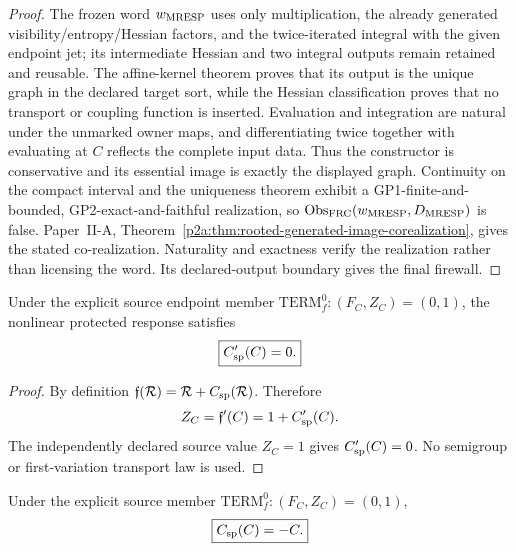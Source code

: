 \documentclass[12pt,a4paper]{article}
\begin{document}
\begin{proof}
The frozen word \(w_{\rm MRESP}\) uses only multiplication, the already generated
visibility/entropy/Hessian factors, and the twice-iterated integral with the
given endpoint jet; its intermediate Hessian and two integral outputs remain
retained and reusable.  The affine-kernel theorem proves that its output is the
unique graph in the declared target sort, while the Hessian classification
proves that no transport or coupling function is inserted.  Evaluation and
integration are natural under the unmarked owner maps, and differentiating
twice together with evaluating at \(C\) reflects the complete input data.
Thus the constructor is conservative and its essential image is exactly the
displayed graph.  Continuity on the compact interval and the uniqueness
theorem exhibit a GP1-finite-and-bounded, GP2-exact-and-faithful realization,
so \(\operatorname{Obs}_{\rm FRC}(w_{\rm MRESP},D_{\rm MRESP})\) is false.
Paper~II-A,
Theorem~\ref{p2a:thm:rooted-generated-image-corealization}, gives the stated
co-realization.  Naturality and exactness verify the realization rather than
licensing the word.  Its declared-output boundary gives the final firewall.
\end{proof}

\begin{lemma}
\label{p3:lem:terminal-protected-slope}
Under the explicit source endpoint member
\(\mathrm{TERM}_f^0:(F_C,Z_C)=(0,1)\), the nonlinear protected
response satisfies
\begin{equation}
\label{p3:eq:terminal-protected-zero-slope}
 \boxed{C_{\rm sp}'(C)=0.}
\end{equation}
\end{lemma}

\begin{proof}
By definition
\(\mathfrak f(\mathcal R)=\mathcal R+C_{\rm sp}(\mathcal R)\).  Therefore
\[
 Z_C=\mathfrak f'(C)=1+C_{\rm sp}'(C).
\]
The independently declared source value \(Z_C=1\) gives
\(C_{\rm sp}'(C)=0\).  No semigroup or first-variation transport law is
used.
\end{proof}

\begin{lemma}
\label{p3:lem:terminal-hamiltonian-lagrangian-sign}
Under the explicit source member \(\mathrm{TERM}_f^0:(F_C,Z_C)=(0,1)\),
\begin{equation}
\label{p3:eq:terminal-legendre-sign}
 \boxed{C_{\rm sp}(C)=-C.}
\end{equation}
\end{lemma}
\end{document}
